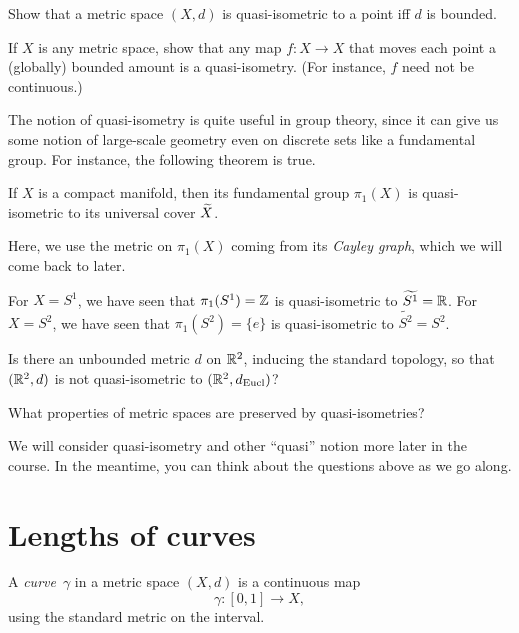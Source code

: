\documentclass[12pt]{amsart}
\begin{document}
\begin{exercise}
  Show that a metric space $(X,d)$ is quasi-isometric to a point iff
  $d$ is bounded.
\end{exercise}

\begin{exercise}
  If $X$ is any metric space, show that any map $f \colon X \to X$
  that moves each point a (globally) bounded amount is a
  quasi-isometry. (For instance, $f$ need not be continuous.)
\end{exercise}

The notion of quasi-isometry is quite useful in group theory, since it
can give us some notion of large-scale geometry even on discrete sets
like a fundamental group. For instance, the following theorem is true.

\begin{theorem}
  If $X$ is a compact manifold,
  then its fundamental group $\pi_1(X)$ is quasi-isometric to its
  universal cover $\widetilde{X}$.
\end{theorem}

Here, we use the metric on $\pi_1(X)$ coming from its \emph{Cayley
  graph}, which we will come back to later.

\begin{example}
  For $X = S^1$, we have seen that $\pi_1(S^1) = \mathbb Z$ is
  quasi-isometric to $\widetilde{S^1} = \mathbb R$. For $X = S^2$, we have
  seen that $\pi_1(S^2) = \{e\}$ is quasi-isometric to
  $\widetilde{S^2} = S^2$.
\end{example}

\begin{question}
  Is there an unbounded metric $d$ on $\mathbb R^2$, inducing the standard
  topology, so that $(\mathbb R^2,d)$ is not quasi-isometric to
  $(\mathbb R^2,d_{\text{Eucl}})$?
\end{question}

\begin{question}
  What properties of metric spaces are preserved by quasi-isometries?
\end{question}

We will consider quasi-isometry and other ``quasi'' notion more later
in the course. In the meantime, you can think about the questions
above as we go along.

\section{Lengths of curves}
\label{sec:lengths}

\begin{definition}
  A \emph{curve}~$\gamma$ in a metric space $(X,d)$ is a continuous map
  \[
    \gamma\colon [0,1] \to X,
  \]
  using the standard metric on the interval.
\end{definition}
\end{document}
